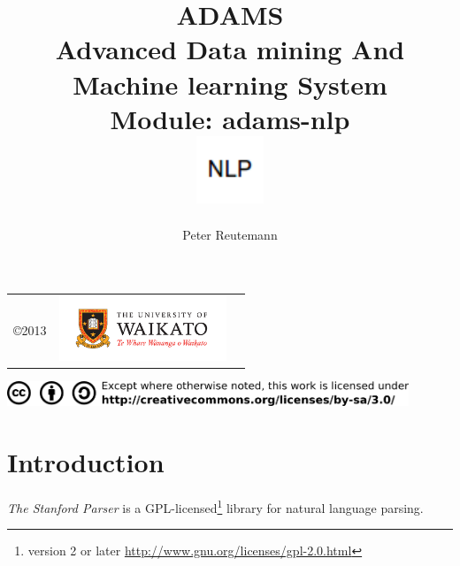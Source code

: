 \documentclass[a4paper]{book}
\title{
  \textbf{ADAMS} \\
  {\Large \textbf{A}dvanced \textbf{D}ata mining \textbf{A}nd \textbf{M}achine
  learning \textbf{S}ystem} \\
  {\Large Module: adams-nlp} \\
  \vspace{1cm}
  \includegraphics[width=2cm]{images/nlp-module.png} \\
}
\author{
  Peter Reutemann
}
\begin{document}
\begin{titlepage}
\maketitle

\thispagestyle{empty}
\center
\begin{table}[b]
	\begin{tabular}{c l l}
		\parbox[c][2cm]{2cm}{\copyright 2013} &
		\parbox[c][2cm]{5cm}{\includegraphics[width=5cm]{images/coat_of_arms.pdf}} \\
	\end{tabular}
	\includegraphics[width=12cm]{images/cc.png} \\
\end{table}

\end{titlepage}

\tableofcontents
\listoffigures

\chapter{Introduction}
\textit{The Stanford Parser} is a GPL-licensed\footnote{version 2 or later \url{http://www.gnu.org/licenses/gpl-2.0.html}{}} 
library for natural language parsing.
\end{document}
